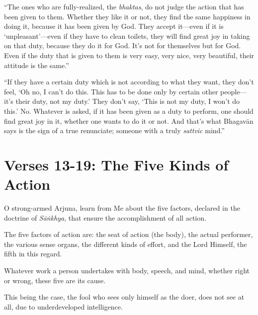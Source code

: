 \enquote{The ones who are fully-realized, the \textit{bhaktas}, do not judge the action that has been given to them. Whether they like it or not, they find the same happiness in doing it, because it has been given by God. They accept it---even if it is \enquote{unpleasant}---even if they have to clean toilets, they will find great joy in taking on that duty, because they do it for God. It’s not for themselves but for God. Even if the duty that is given to them is very easy, very nice, very beautiful, their attitude is the same.}

\enquote{If they have a certain duty which is not according to what they want, they don’t feel, \enquote{Oh no, I can’t do this. This has to be done only by certain other people---it’s their duty, not my duty.} They don’t say, \enquote{This is not my duty, I won’t do this.} No. Whatever is asked, if it has been given as a duty to perform, one should find great joy in it, whether one wants to do it or not. And that’s what Bhagavān says is the sign of a true renunciate; someone with a truly \textit{sattvic} mind.}

\section{Verses 13-19: The Five Kinds of Action}\label{sec-verses-13-19-the-five-kinds-of-action}

{O strong-armed Arjuna, learn from Me about the five factors, declared in the doctrine of \textit{Sāṅkhya}, that ensure the accomplishment of all action.}

{The five factors of action are: the seat of action (the body), the actual performer, the various sense organs, the different kinds of effort, and the Lord Himself, the fifth in this regard.}

{Whatever work a person undertakes with body, speech, and mind, whether right or wrong, these five are its cause.}

{This being the case, the fool who sees only himself as the doer, does not see at all, due to underdeveloped intelligence.}

